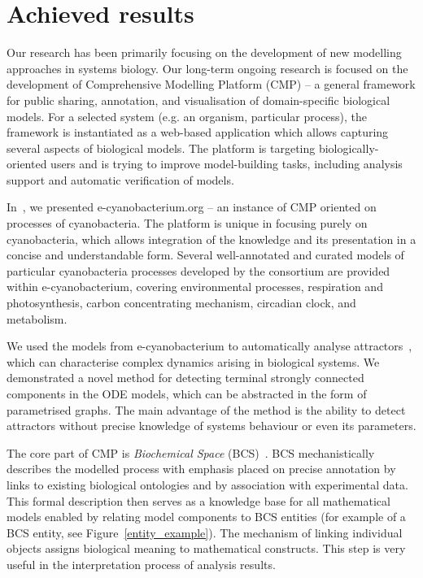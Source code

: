 \documentclass[11pt,a4paper]{report}
\begin{document}

\chapter{Achieved results}

Our research has been primarily focusing on the development of new modelling approaches in systems biology. Our long-term ongoing research is focused on the development of Comprehensive Modelling Platform (CMP) -- a general framework for public sharing, annotation, and visualisation of domain-specific biological models. For a selected system (e.g. an organism, particular process), the framework is instantiated as a web-based application which allows capturing several aspects of biological models. The platform is targeting biologically-oriented users and is trying to improve model-building tasks, including analysis support and automatic verification of models.

In~\cite{trojak2016cyanobacterium}, we presented e-cyanobacterium.org -- an instance of CMP oriented on processes of cyanobacteria. The platform is unique in focusing purely on cyanobacteria, which allows integration of the knowledge and its presentation in a concise and understandable form. Several well-annotated and curated models of particular cyanobacteria processes developed by the consortium are provided within e-cyanobacterium, covering environmental processes, respiration and photosynthesis, carbon concentrating mechanism, circadian clock, and metabolism.

We used the models from e-cyanobacterium to automatically analyse attractors~\cite{benevs2018fully}, which can characterise complex dynamics arising in biological systems. We demonstrated a novel method for detecting terminal strongly connected components in the ODE models, which can be abstracted in the form of parametrised graphs. The main advantage of the method is the ability to detect attractors without precise knowledge of systems behaviour or even its parameters.

The core part of CMP is \emph{Biochemical Space} (BCS)~\cite{BCS}. BCS mechanistically describes the modelled process with emphasis placed on precise annotation by links to existing biological ontologies and by association with experimental data. This formal description then serves as a knowledge base for all mathematical models enabled by relating model components to BCS entities (for example of a BCS entity, see Figure~\ref{entity_example}). The mechanism of linking individual objects assigns biological meaning to mathematical constructs. This step is very useful in the interpretation process of analysis results.
\end{document}
